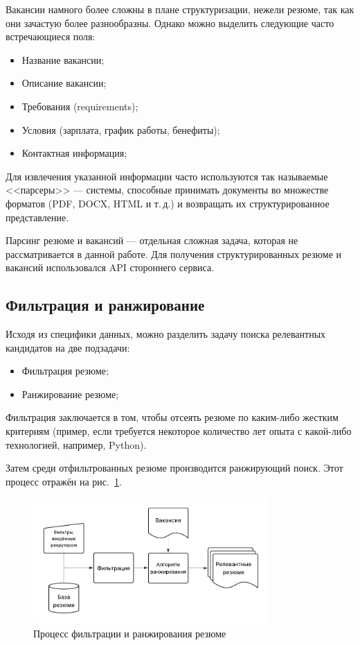 \documentclass[14pt]{mmcs_article}
\begin{document}
Вакансии намного более сложны в плане структуризации, нежели резюме, так как они зачастую более разнообразны. Однако можно выделить следующие часто встречающиеся поля:

\begin{itemize}
  \item Название вакансии;
  \item Описание вакансии;
  \item Требования (requirements);
  \item Условия (зарплата, график работы, бенефиты);
  \item Контактная информация;
\end{itemize}

Для извлечения указанной информации часто используются так называемые <<парсеры>> --- системы, способные принимать документы во множестве форматов (PDF, DOCX, HTML и т.\,д.) и возвращать их структурированное представление.

Парсинг резюме и вакансий --- отдельная сложная задача, которая не рассматривается в данной работе. Для получения структурированных резюме и вакансий использовался API стороннего сервиса.

\subsection{Фильтрация и ранжирование}\label{filtering_and_ranking}

Исходя из специфики данных, можно разделить задачу поиска релевантных кандидатов на две подзадачи:

\begin{itemize}
  \item Фильтрация резюме;
  \item Ранжирование резюме;
\end{itemize}

Фильтрация заключается в том, чтобы отсеять резюме по каким-либо жестким критериям (пример, если требуется некоторое количество лет опыта с какой-либо технологией, например, Python).

Затем среди отфильтрованных резюме производится ранжирующий поиск. Этот процесс отражён на рис.~\ref{fig:filtering_and_ranking}.

\begin{figure}[h]
  \centering
  \includegraphics[width=0.8\textwidth]{plots/filtering_and_ranking.pdf}
  \caption{\centering Процесс фильтрации и ранжирования резюме}
  \label{fig:filtering_and_ranking}
\end{figure}
\end{document}
